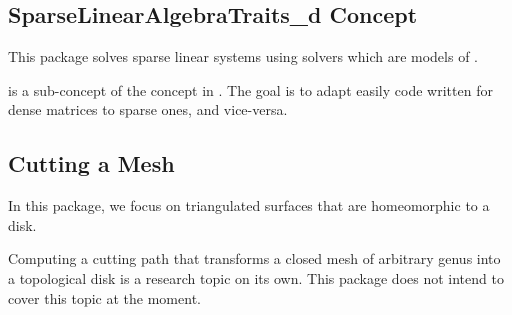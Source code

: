 \subsection{SparseLinearAlgebraTraits\_d Concept}

This package solves sparse linear systems using solvers which are models
of .

 is a sub-concept of the  concept
in .
The goal is to adapt easily code written for dense matrices to sparse ones,
and vice-versa.


\subsection{Cutting a Mesh}

In this package, we focus on triangulated surfaces that are homeomorphic to a
disk.

Computing a cutting path that transforms a closed mesh of arbitrary genus into
a topological disk is a research topic on its own. This package does
not intend to cover this topic at the moment.



